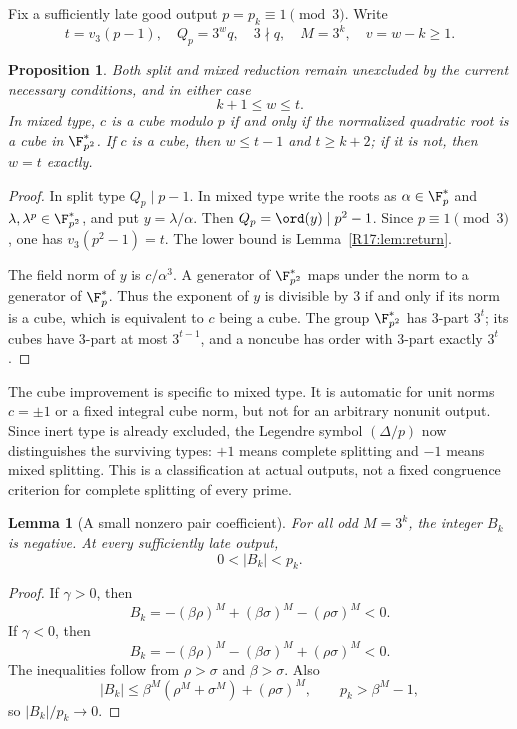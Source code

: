 \documentclass[11pt,a4paper]{article}
\newtheorem{lemma}[theorem]{Lemma}\newtheorem{proposition}[theorem]{Proposition}
\theoremstyle{definition}\newtheorem{definition}[theorem]{Definition}
\theoremstyle{remark}\newtheorem{remark}[theorem]{Remark}
\begin{document}
Fix a sufficiently late good output $p=p_k\equiv1\pmod3$. Write
\[
 t=v_3(p-1),\quad Q_p=3^wq,\quad3\nmid q,
 \quad M=3^k,\quad v=w-k\ge1.
\]

\begin{proposition}\label{R17:prop:split}
Both split and mixed reduction remain unexcluded by the current necessary
conditions, and in either case
\[
 k+1\le w\le t.
\]
In mixed type, $c$ is a cube modulo $p$ if and only if the normalized
quadratic root is a cube in $\F_{p^2}^*$. If $c$ is a cube, then
$w\le t-1$ and $t\ge k+2$; if it is not, then $w=t$ exactly.
\end{proposition}
\begin{proof}
In split type $Q_p\mid p-1$. In mixed type write the roots as
$\alpha\in\F_p^*$ and $\lambda,\lambda^p\in\F_{p^2}^*$, and put
$y=\lambda/\alpha$. Then $Q_p=\ord(y)\mid p^2-1$.
Since $p\equiv1\pmod3$, one has $v_3(p^2-1)=t$. The lower bound is
Lemma~\ref{R17:lem:return}.

The field norm of $y$ is $c/\alpha^3$. A generator of
$\F_{p^2}^*$ maps under the norm to a generator of $\F_p^*$.
Thus the exponent of $y$ is divisible by $3$ if and only if its norm
is a cube, which is equivalent to $c$ being a cube. The group
$\F_{p^2}^*$ has $3$-part $3^t$; its cubes have $3$-part at most
$3^{t-1}$, and a noncube has order with $3$-part exactly $3^t$.
\end{proof}

The cube improvement is specific to mixed type. It is automatic for
unit norms $c=\pm1$ or a fixed integral cube norm, but not for an
arbitrary nonunit output. Since inert type is already excluded, the
Legendre symbol $(\Delta/p)$ now distinguishes the surviving types:
$+1$ means complete splitting and $-1$ means mixed splitting.
This is a classification at actual outputs, not a fixed congruence
criterion for complete splitting of every prime.

\begin{lemma}[A small nonzero pair coefficient]\label{R17:lem:B}
For all odd $M=3^k$, the integer $B_k$ is negative. At every sufficiently
late output,
\begin{equation}\label{R17:eq:Bsmall}
 0<|B_k|<p_k.
\end{equation}
\end{lemma}
\begin{proof}
If $\gamma>0$, then
\[
 B_k=-(\beta\rho)^M+(\beta\sigma)^M-(\rho\sigma)^M<0.
\]
If $\gamma<0$, then
\[
 B_k=-(\beta\rho)^M-(\beta\sigma)^M+(\rho\sigma)^M<0.
\]
The inequalities follow from $\rho>\sigma$ and $\beta>\sigma$.
Also
\[
 |B_k|\le\beta^M(\rho^M+\sigma^M)+(\rho\sigma)^M,
 \qquad p_k>\beta^M-1,
\]
so $|B_k|/p_k\to0$.
\end{proof}
\end{document}
